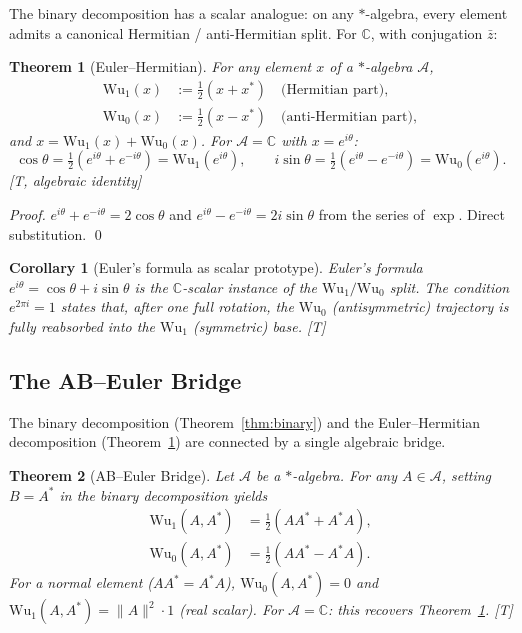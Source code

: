 \documentclass[11pt, a4paper]{article}
\newtheorem{theorem}{Theorem}
\newtheorem{corollary}{Corollary}
\newcommand{\C}{\mathbb{C}}
\newcommand{\Wuz}{\mathrm{Wu}_0}
\newcommand{\Wuo}{\mathrm{Wu}_1}
\newcommand{\norm}[1]{\lVert #1 \rVert}
\begin{document}
The binary decomposition has a scalar analogue: on any
$*$-algebra, every element admits a canonical Hermitian /
anti-Hermitian split. For $\C$, with conjugation $\bar{z}$:

\begin{theorem}[Euler--Hermitian]
\label{thm:euler_hermitian}
For any element $x$ of a $*$-algebra $\mathcal{A}$,
\begin{align}
\Wuo(x) &:= \tfrac{1}{2}(x + x^*) \quad \text{(Hermitian part)}, \\
\Wuz(x) &:= \tfrac{1}{2}(x - x^*) \quad \text{(anti-Hermitian part)},
\end{align}
and $x = \Wuo(x) + \Wuz(x)$. For $\mathcal{A} = \C$ with
$x = e^{i\theta}$:
\begin{equation}
\cos\theta = \tfrac{1}{2}(e^{i\theta} + e^{-i\theta}) = \Wuo(e^{i\theta}),
\qquad
i\sin\theta = \tfrac{1}{2}(e^{i\theta} - e^{-i\theta}) = \Wuz(e^{i\theta}).
\end{equation}
[T, algebraic identity]
\end{theorem}

\begin{proof}
$e^{i\theta} + e^{-i\theta} = 2\cos\theta$ and
$e^{i\theta} - e^{-i\theta} = 2i\sin\theta$ from the series of
$\exp$. Direct substitution. \qed
\end{proof}

\begin{corollary}[Euler's formula as scalar prototype]
\label{cor:euler_prototype}
Euler's formula $e^{i\theta} = \cos\theta + i\sin\theta$ is the
$\C$-scalar instance of the $\Wuo / \Wuz$ split. The condition
$e^{2\pi i} = 1$ states that, after one full rotation, the
$\Wuz$ (antisymmetric) trajectory is fully reabsorbed into the
$\Wuo$ (symmetric) base. [T]
\end{corollary}

\subsection{The AB--Euler Bridge}

The binary decomposition (Theorem~\ref{thm:binary}) and the
Euler--Hermitian decomposition (Theorem~\ref{thm:euler_hermitian})
are connected by a single algebraic bridge.

\begin{theorem}[AB--Euler Bridge]
\label{thm:ab_euler_bridge}
Let $\mathcal{A}$ be a $*$-algebra. For any $A \in \mathcal{A}$,
setting $B = A^*$ in the binary decomposition yields
\begin{align}
\Wuo(A, A^*) &= \tfrac{1}{2}(AA^* + A^*A), \\
\Wuz(A, A^*) &= \tfrac{1}{2}(AA^* - A^*A).
\end{align}
For a normal element ($AA^* = A^*A$), $\Wuz(A, A^*) = 0$ and
$\Wuo(A, A^*) = \norm{A}^2 \cdot 1$ (real scalar). For $\mathcal{A} = \C$:
this recovers Theorem~\ref{thm:euler_hermitian}. [T]
\end{theorem}
\end{document}
